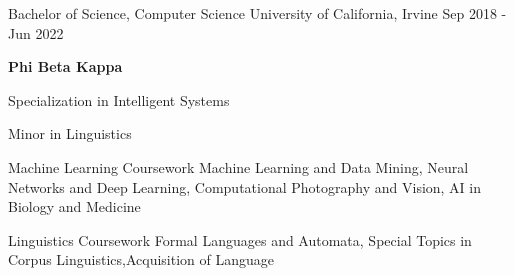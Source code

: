 
\begin{cventries}
  \cventry
    {Bachelor of Science, Computer Science} %
    {University of California, Irvine} %
    {} %
    {Sep 2018 - Jun 2022} %
    {
      \begin {cvitems}
        \item{\textbf{Phi Beta Kappa}}
        \item{Specialization in Intelligent Systems}
        \item{Minor in Linguistics}
      \end{cvitems}
    }
\end{cventries}

\begin{cvskills}
  \cvskill
    {Machine Learning Coursework}
    {Machine Learning and Data Mining, Neural Networks and Deep Learning, \newline Computational Photography and Vision, AI in Biology and Medicine}

  \cvskill
    {Linguistics Coursework}
    {Formal Languages and Automata, Special Topics in Corpus Linguistics,\newline Acquisition of Language}
  
\end{cvskills}
